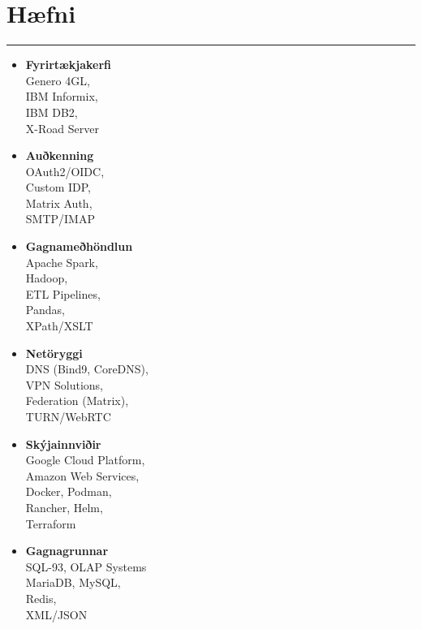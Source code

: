 \documentclass[a4paper,10pt]{article}
\newcommand{\cvheading}[1]{%
  \section*{#1}
  \vspace{-0.2cm}
  \hrule
  \vspace{0.2cm}
}
\begin{document}
\cvheading{Hæfni}
\begin{multicols}{3}
	\begin{itemize}[nosep, leftmargin=*]
		\item \textbf{Fyrirtækjakerfi}\\
		      Genero 4GL,\\
		      IBM Informix,\\
		      IBM DB2,\\
		      X-Road Server

		\item \textbf{Auðkenning}\\
		      OAuth2/OIDC,\\
		      Custom IDP,\\
		      Matrix Auth,\\
		      SMTP/IMAP

		\item \textbf{Gagnameðhöndlun}\\
		      Apache Spark,\\
		      Hadoop,\\
		      ETL Pipelines,\\
		      Pandas,\\
		      XPath/XSLT

		      \columnbreak

		\item \textbf{Netöryggi}\\
		      DNS (Bind9, CoreDNS),\\
		      VPN Solutions,\\
		      Federation (Matrix),\\
		      TURN/WebRTC

		\item \textbf{Skýjainnviðir}\\
		      Google Cloud Platform,\\
		      Amazon Web Services,\\
		      Docker, Podman,\\
		      Rancher, Helm,\\
		      Terraform

		\item \textbf{Gagnagrunnar}\\
		      SQL-93, OLAP Systems\\
		      MariaDB, MySQL,\\
		      Redis,\\
		      XML/JSON

		      \columnbreak


\end{itemize}
\end{multicols}
\end{document}
